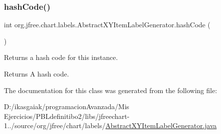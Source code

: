 \subsubsection{\texorpdfstring{hash\+Code()}{hashCode()}}
{\footnotesize\ttfamily int org.\+jfree.\+chart.\+labels.\+Abstract\+X\+Y\+Item\+Label\+Generator.\+hash\+Code (\begin{DoxyParamCaption}{ }\end{DoxyParamCaption})}

Returns a hash code for this instance.

\begin{DoxyReturn}{Returns}
A hash code. 
\end{DoxyReturn}


The documentation for this class was generated from the following file\+:\begin{DoxyCompactItemize}
\item 
D\+:/ikasgaiak/programacion\+Avanzada/\+Mis Ejercicios/\+P\+B\+Ldefinitibo2/libs/jfreechart-\/1../source/org/jfree/chart/labels/\mbox{\hyperlink{_abstract_x_y_item_label_generator_8java}{Abstract\+X\+Y\+Item\+Label\+Generator.\+java}}\end{DoxyCompactItemize}
